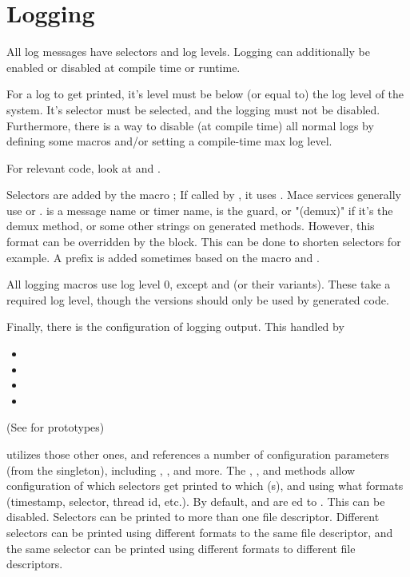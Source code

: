 \section{Logging}
\label{sec:log}
All log messages have selectors and log levels.  Logging can
additionally be enabled or disabled at compile time or runtime.

For a log to get printed, it's level must be below (or equal to) the log
level of the system.  It's selector must be selected, and the logging
must not be disabled.  Furthermore, there is a way to disable (at
compile time) all normal logs by defining some macros and/or setting a
compile-time max log level.

For relevant code, look at  and
.

Selectors are added by the macro ;  If called by
, it uses
.  Mace services
generally use  or
.
 is a message name or
timer name,  is the guard, or "(demux)" if it's the demux method,
or some other strings on generated methods. However, this format can be
overridden by the  block.  This can be done
to shorten selectors for example.  A prefix is added sometimes
based on the macro and .

All logging macros use log level 0, except  and
 (or their  variants).  These take
a required log level, though the  versions should only be used
by generated code.

Finally, there is the configuration of logging output.  This handled by
\begin{itemize}
\item {}
\item {}
\item {}
\item {}
\end{itemize}

(See  for prototypes)

 utilizes those other ones, and references a number of
configuration parameters (from the  singleton),
including ,
, and more.
The , , and  methods allow configuration of which selectors get printed to
which (s), and using what formats (timestamp, selector, thread id,
etc.).  By default,  and
 are ed to .  This can be disabled.  Selectors can
be printed to more than one file descriptor.  Different selectors can be
printed using different formats to the same file descriptor, and the
same selector can be printed using different formats to different file
descriptors.

